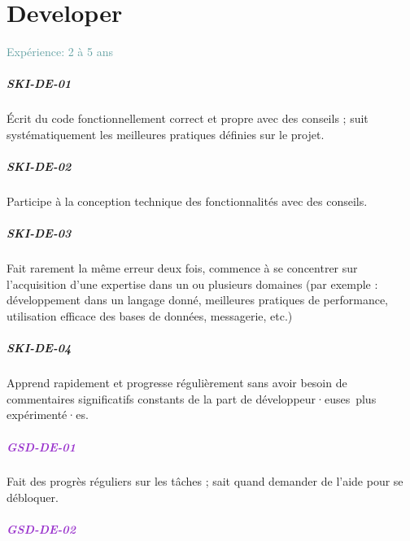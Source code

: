 \documentclass[a4paper, french, openany, 12pt]{book}
\newcommand\dex[1]{\textcolor{BrickRed}{\textbf{\uppercase{ski-{#1}}}}}
\newcommand\str[1]{\textcolor{DarkOrchid}{\textbf{\uppercase{gsd-{#1}}}}}
\newcommand\xp[1]{\textcolor{CadetBlue}{Expérience: {#1} ans}}
\newcommand\devs{développeur·euses}
\begin{document}
\chapter{Developer}

\xp{2 à 5}

\begin{multicols}{2}

  \paragraph*{\dex{de-01}}

  Écrit du code fonctionnellement correct et propre avec des conseils ; suit systématiquement les meilleures pratiques 
  définies sur le projet.

  \paragraph*{\dex{de-02}}

  Participe à la conception technique des fonctionnalités avec des conseils.

  \paragraph*{\dex{de-03}}

  Fait rarement la même erreur deux fois, commence à se concentrer sur l'acquisition d'une expertise dans un ou plusieurs 
  domaines (par exemple : développement dans un langage donné, meilleures pratiques de performance, utilisation efficace 
  des bases de données, messagerie, etc.)

  \paragraph*{\dex{de-04}}

  Apprend rapidement et progresse régulièrement sans avoir besoin de commentaires significatifs constants de la part 
  de \devs\ plus expérimenté·es.

  \paragraph*{\str{de-01}}

  Fait des progrès réguliers sur les tâches ; sait quand demander de l'aide pour se débloquer.

  \paragraph*{\str{de-02}}


\end{multicols}
\end{document}
